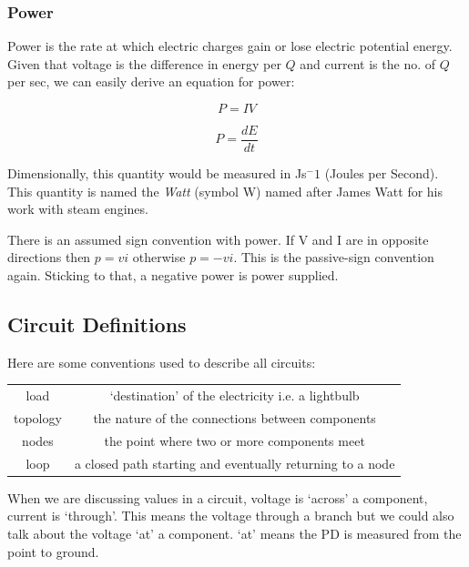 \documentclass[12pt]{article}
\begin{document}
\subsubsection{Power}
Power is the rate at which electric charges gain or lose electric potential energy.
Given that voltage is the difference in energy per $Q$ and current is the no. of $Q$ per sec, we can easily derive an equation for power:
\begin{multicols}{2}
\begin{equation*}
  P = IV 
\end{equation*}

\begin{equation*}
  P = \frac{dE}{dt} 
\end{equation*}
\end{multicols}
Dimensionally, this quantity would be measured in Js$^-1$ (Joules per Second).
This quantity is named the \textit{Watt} (symbol W) named after James Watt for his work with steam engines.


There is an assumed sign convention with power.
If V and I are in opposite directions then $p=vi$ otherwise $p=-vi$.
This is the passive-sign convention again.
Sticking to that, a negative power is power supplied.

\subsection{Circuit Definitions}
Here are some conventions used to describe all circuits:

\begin{tabular}{c|c}
load & `destination' of the electricity i.e. a lightbulb \\
topology & the nature of the connections between components \\
nodes & the point where two or more components meet \\
loop & a closed path starting and eventually returning to a node \\
\end{tabular}

When we are discussing values in a circuit, voltage is `across' a component, current is `through'. 
This means the voltage through a branch but we could also talk about the voltage `at' a component.
`at' means the PD is measured from the point to ground.
\end{document}
